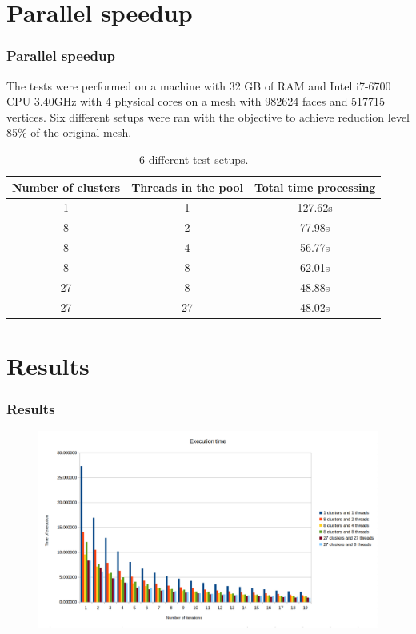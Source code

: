 \documentclass[
	10pt,
	t		%
]{beamer}
\begin{document}
\section{Parallel speedup}
\begin{frame}
\centering
\frametitle{Parallel speedup}
The tests were performed on a machine with 32 GB of RAM and Intel i7-6700 CPU 3.40GHz with 4 physical cores on a mesh with 982624 faces and 517715 vertices. Six different setups were ran with the objective to achieve reduction level 85\% of the original mesh.
\begin{table}[h!]
\centering
\begin{tabular}{ |c|c|c| } 
 \hline
 Number of clusters & Threads in the pool & Total time processing\\
 \hline
 1 & 1 & 127.62s\\
 8 & 2 & 77.98s\\
 8 & 4 & 56.77s\\
 8 & 8 & 62.01s\\
 27 & 8 & 48.88s\\
 27 & 27 & 48.02s\\
 \hline
\end{tabular}
\caption{6 different test setups.}
\end{table}
\end{frame}

\section{Results}
\begin{frame}
\frametitle{Results}
\begin{figure}[ht]
\centering
\includegraphics[width=1\textwidth]{chart}
\end{figure}
\end{frame}
\end{document}
